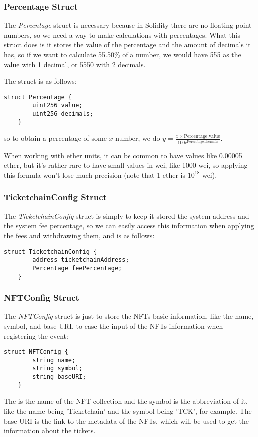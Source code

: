 \subsubsection{Percentage Struct}
\label{subsubsec:percentage_struct}

The \textit{Percentage} struct is necessary because in Solidity there are no
floating point numbers, so we need a way to make calculations with percentages.
What this struct does is it stores the value of the percentage and the amount
of decimals it has, so if we want to calculate 55.50\% of a number, we would
have 555 as the value with 1 decimal, or 5550 with 2 decimals.

The struct is as follows:
\begin{lstlisting}[caption=Percentage struct]
    struct Percentage {
        uint256 value;
        uint256 decimals;
    }
\end{lstlisting}
so to obtain a percentage of some $x$ number, we do $y = \frac{x \times
		\text{Percentage.value}}{100\mathrm{e}^\text{Percentage.decimals}}$.

When working with ether units, it can be common to have values like 0.00005
ether, but it's rather rare to have small values in wei, like 1000 wei, so
applying this formula won't lose much precision (note that 1 ether is $10^{18}$
wei).

\subsubsection{TicketchainConfig Struct}
\label{subsubsec:ticketchainconfig_struct}

The \textit{TicketchainConfig} struct is simply to keep it stored the system
address and the system fee percentage, so we can easily access this information
when applying the fees and withdrawing them, and is as follows:
\begin{lstlisting}[caption=TicketchainConfig struct]
    struct TicketchainConfig {
        address ticketchainAddress;
        Percentage feePercentage;
    }
\end{lstlisting}

\subsubsection{NFTConfig Struct}
\label{subsubsec:nftconfig_struct}

The \textit{NFTConfig} struct is just to store the NFTs basic information, like
the name, symbol, and base URI, to ease the input of the NFTs information when
registering the event:
\begin{lstlisting}[caption=NFTConfig struct]
    struct NFTConfig {
        string name;
        string symbol;
        string baseURI;
    }
\end{lstlisting}
The is the name of the NFT collection and the symbol is the abbreviation of it,
like the name being 'Ticketchain' and the symbol being 'TCK', for example. The
base URI is the link to the metadata of the NFTs, which will be used to get the
information about the tickets.

